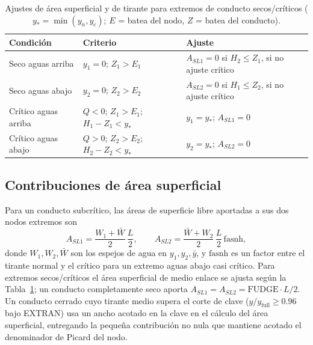 \documentclass[11pt,a4paper]{article}
\begin{document}
\begin{table}[H]
\centering
\small
\begin{tabular}{lll}
\toprule
\textbf{Condición} & \textbf{Criterio} & \textbf{Ajuste} \\
\midrule
Seco aguas arriba & $y_1 = 0$; $Z_1 > E_1$ & $A_{SL1} = 0$ si $H_2 \le Z_1$, si no ajuste crítico \\
Seco aguas abajo & $y_2 = 0$; $Z_2 > E_2$ & $A_{SL2} = 0$ si $H_1 \le Z_2$, si no ajuste crítico \\
Crítico aguas arriba & $Q < 0$; $Z_1 > E_1$; $H_1 - Z_1 < y_*$ & $y_1 = y_*$; $A_{SL1} = 0$ \\
Crítico aguas abajo & $Q > 0$; $Z_2 > E_2$; $H_2 - Z_2 < y_*$ & $y_2 = y_*$; $A_{SL2} = 0$ \\
\bottomrule
\end{tabular}
\caption{Ajustes de área superficial y de tirante para extremos de conducto
secos/críticos ($y_* = \min(y_n, y_c)$; $E$ = batea del nodo, $Z$ = batea del
conducto).}
\label{tab:surfadj}
\end{table}

\subsection{Contribuciones de área superficial}

Para un conducto subcrítico, las áreas de superficie libre aportadas a sus dos
nodos extremos son
\begin{equation}
  A_{SL1} = \frac{W_1 + \bar{W}}{2}\,\frac{L}{2},
  \qquad
  A_{SL2} = \frac{\bar{W} + W_2}{2}\,\frac{L}{2}\,
  \mathrm{fasnh},
\end{equation}
donde $W_1, W_2, \bar W$ son los espejos de agua en $y_1, y_2, \bar y$, y
$\mathrm{fasnh}$ es un factor entre el tirante normal y el crítico para un
extremo aguas abajo casi crítico. Para extremos secos/críticos el área
superficial de medio enlace se ajusta según la Tabla~\ref{tab:surfadj}; un
conducto completamente seco aporta $A_{SL1} = A_{SL2} =
\mathrm{FUDGE}\cdot L/2$. Un conducto cerrado cuyo tirante medio supera el
corte de clave ($y/y_{\mathrm{full}} \ge 0.96$ bajo EXTRAN) usa un ancho
acotado en la clave en el cálculo del área superficial, entregando la pequeña
contribución no nula que mantiene acotado el denominador de Picard del nodo.

\end{document}
